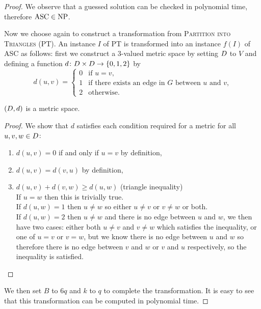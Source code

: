 \begin{proof}
  We observe that a guessed solution can be checked in polynomial time,
  therefore $\text{ASC} \in \text{NP}$.

  Now we choose again to construct a transformation from \textsc{Partition
    into Triangles} (PT).  An instance $I$ of PT is transformed into an
  instance $f(I)$ of ASC as follows: first we construct a 3-valued metric
  space by setting $D$ to $V$ and defining a function $d \colon D
  \times D \to \{0,1,2\}$ by
  \begin{equation*}
    d(u,v) = \begin{cases}
      0 & \text{if $u=v$,}\\
      1 & \text{if there exists an edge in $G$ between $u$ and $v$,}\\
      2 & \text{otherwise.}
    \end{cases}
  \end{equation*}

  \begin{lem}
    \label{lem:3-val-met}
    $(D,d)$ is a metric space.
  \end{lem}
  
  \begin{proof}
    We show that $d$ satisfies each condition required for a metric for all
    $u,v,w \in D$:
    \begin{enumerate}
    \item $d(u,v)=0$ if and only if $u=v$ by definition,
    \item $d(u,v)=d(v,u)$ by definition,
    \item $d(u,v)+d(v,w) \geq d(u,w)$ (triangle inequality)\\
      If $u=w$ then this is trivially true.\\
      If $d(u,w)=1$ then $u \neq w$ so either $u \neq v$ or $v \neq w$ or
      both.\\
      If $d(u,w)=2$ then $u \neq w$ and there is no edge between $u$ and $w$,
      we then have two cases: either both $u \neq v$ and $v \neq w$ which
      satisfies the inequality, or one of $u=v$ or $v=w$, but we know there is
      no edge between $u$ and $w$ so therefore there is no edge between $v$
      and $w$ or $v$ and $u$ respectively, so the inequality is satisfied.
    \end{enumerate}
  \end{proof}

  We then set $B$ to $6q$ and $k$ to $q$ to complete the transformation.  It
  is easy to see that this transformation can be computed in polynomial time.


\end{proof}
